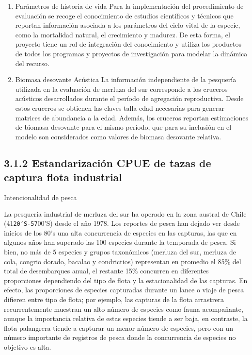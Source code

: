 \documentclass[
  spanish,
]{article}
\begin{document}
\begin{enumerate}
\def\labelenumi{\roman{enumi}.}
\setcounter{enumi}{2}
\item
  Parámetros de historia de vida Para la implementación del
  procedimiento de evaluación se recoge el conocimiento de estudios
  científicos y técnicos que reportan información asociada a los
  parámetros del ciclo vital de la especie, como la mortalidad natural,
  el crecimiento y madurez. De esta forma, el proyecto tiene un rol de
  integración del conocimiento y utiliza los productos de todos los
  programas y proyectos de investigación para modelar la dinámica del
  recurso.
\item
  Biomasa desovante Acústica La información independiente de la
  pesquería utilizada en la evaluación de merluza del sur corresponde a
  los cruceros acústicos desarrollados durante el período de agregación
  reproductiva. Desde estos cruceros se obtienen las claves talla-edad
  necesarias para generar matrices de abundancia a la edad. Además, los
  cruceros reportan estimaciones de biomasa desovante para el mismo
  período, que para su inclusión en el modelo son considerados como
  valores de biomasa desovante relativa.
\end{enumerate}

\hypertarget{estandarizaciuxf3n-cpue-de-tazas-de-captura-flota-industrial}{%
\subsection{3.1.2 Estandarización CPUE de tazas de captura flota
industrial}\label{estandarizaciuxf3n-cpue-de-tazas-de-captura-flota-industrial}}

Intencionalidad de pesca

La pesquería industrial de merluza del sur ha operado en la zona austral
de Chile (41\texttt{20’S-57}00'S) desde el año 1978. Los reportes de
pesca han dejado ver desde inicios de los 80's una alta concurrencia de
especies en las capturas, las que en algunos años han superado las 100
especies durante la temporada de pesca. Si bien, no más de 5 especies y
grupos taxonómicos (merluza del sur, merluza de cola, congrio dorado,
bacalao y condrictios) representan en promedio el 85\% del total de
desembarques anual, el restante 15\% concurren en diferentes
proporciones dependiendo del tipo de flota y la estacionalidad de las
capturas. En efecto, las proporciones de especies capturadas durante un
lance o viaje de pesca difieren entre tipo de flota; por ejemplo, las
capturas de la flota arrastrera recurrentemente muestran un alto número
de especies como fauna acompañante, aunque la importancia relativa de
estas especies tiende a ser baja, en contraste, la flota palangrera
tiende a capturar un menor número de especies, pero con un número
importante de registros de pesca donde la concurrencia de especies no
objetivo es alta.
\end{document}
